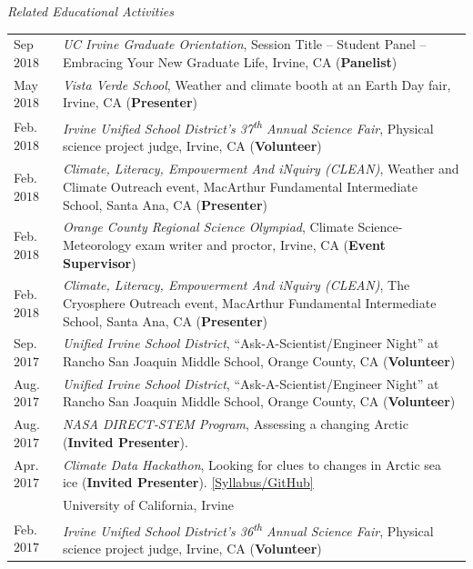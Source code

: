 \documentclass[margin,line,palatino,courier,10pt]{res}
\begin{document}
\begin{resume}
\textit{Related Educational Activities}
\vspace*{0.05in}\\
\begin{tabular}{@{}p{0.8in}p{4in}}
Sep $2018$ & \textit{UC Irvine Graduate Orientation}, Session Title -- Student Panel -- Embracing Your New Graduate Life, Irvine, CA (\textbf{Panelist})\\
May $2018$ & \textit{Vista Verde School}, Weather and climate booth at an Earth Day fair, Irvine, CA (\textbf{Presenter})\\
Feb. $2018$ & \textit{Irvine Unified School District's 37\textsuperscript{th} Annual Science Fair}, Physical science project judge, Irvine, CA (\textbf{Volunteer})\\
Feb. $2018$ & \textit{Climate, Literacy, Empowerment And iNquiry (CLEAN)}, Weather and Climate Outreach event, MacArthur Fundamental Intermediate School, Santa Ana, CA (\textbf{Presenter})\\
Feb. $2018$ & \textit{Orange County Regional Science Olympiad}, Climate Science-Meteorology exam writer and proctor, Irvine, CA (\textbf{Event Supervisor})\\
Feb. $2018$ & \textit{Climate, Literacy, Empowerment And iNquiry (CLEAN)}, The Cryosphere Outreach event, MacArthur Fundamental Intermediate School, Santa Ana, CA (\textbf{Presenter})\\
Sep. $2017$ & \textit{Unified Irvine School District}, ``Ask-A-Scientist/Engineer Night'' at Rancho San Joaquin Middle School, Orange County, CA (\textbf{Volunteer})\\
Aug. $2017$ & \textit{Unified Irvine School District}, ``Ask-A-Scientist/Engineer Night'' at Rancho San Joaquin Middle School, Orange County, CA (\textbf{Volunteer})\\
Aug. $2017$ & \textit{NASA DIRECT-STEM Program}, Assessing a changing Arctic (\textbf{Invited Presenter}).\\
Apr. $2017$ & \textit{Climate Data Hackathon}, Looking for clues to changes in Arctic 
sea ice (\textbf{Invited Presenter}). \href{https://github.com/UCIDataScienceInitiative/Climate_Hackathon}{[Syllabus/GitHub]}\\
& University of California, Irvine\\
Feb. $2017$ & \textit{Irvine Unified School District's 36\textsuperscript{th} Annual Science Fair}, Physical science project judge, Irvine, CA (\textbf{Volunteer})\\
\end{tabular}
\begin{tabular}{@{}p{0.8in}p{4in}}

\end{tabular}
\end{resume}
\end{document}

